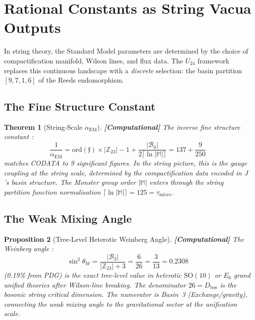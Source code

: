 \documentclass[12pt,a4paper]{article}
\newcommand{\computational}[1]{\textcolor{computational}{\textbf{[Computational]}} #1}
\newtheorem{theorem}{Theorem}[section]
\newtheorem{proposition}[theorem]{Proposition}
\theoremstyle{definition}\newtheorem{definition}[theorem]{Definition}
\theoremstyle{remark}\newtheorem{remark}[theorem]{Remark}
\newcommand{\Reeds}{\mathfrak{f}}
\newcommand{\Zp}{\mathbb{Z}_{23}}
\newcommand{\Monster}{\mathbb{M}}
\newcommand{\Jcoup}{J}
\newcommand{\Basin}{\mathcal{B}}
\begin{document}
\section{Rational Constants as String Vacua Outputs}
\label{sec:constants}

In string theory, the Standard Model parameters are determined by the choice of
compactification manifold, Wilson lines, and flux data. The $U_{24}$ framework
replaces this continuous landscape with a \emph{discrete} selection: the basin
partition $[9, 7, 1, 6]$ of the Reeds endomorphism.

\subsection{The Fine Structure Constant}

\begin{theorem}[String-Scale $\alpha_{\mathrm{EM}}$]
\label{thm:alpha}
\computational{The inverse fine structure constant \cite{paper5}:}
\begin{equation}
  \frac{1}{\alpha_{\mathrm{EM}}} = \mathrm{ord}(\Reeds) \times |\Zp| - 1
  + \frac{|\Basin_0|}{2\lceil \ln|\Monster| \rceil}
  = 137 + \frac{9}{250}
\end{equation}
matches CODATA to 9 significant figures. In the string picture, this is the
gauge coupling at the string scale, determined by the compactification data
encoded in $\Jcoup$'s basin structure. The Monster group order $|\Monster|$
enters through the string partition function normalisation
$\lceil \ln|\Monster| \rceil = 125 = \tau_{\mathrm{micro}}$.
\end{theorem}

\subsection{The Weak Mixing Angle}

\begin{proposition}[Tree-Level Heterotic Weinberg Angle]
\label{prop:weinberg}
\computational{The Weinberg angle \cite{paper5}:}
\begin{equation}
  \sin^2\theta_W = \frac{|\Basin_3|}{|\Zp| + 3} = \frac{6}{26} = \frac{3}{13} = 0.2308
\end{equation}
(0.19\% from PDG) is the exact tree-level value in heterotic $\mathrm{SO}(10)$
or $E_6$ grand unified theories after Wilson-line breaking. The denominator
$26 = D_{\mathrm{bos}}$ is the bosonic string critical dimension. The numerator
is Basin~3 (Exchange/gravity), connecting the weak mixing angle to the
gravitational sector at the unification scale.
\end{proposition}
\end{document}
